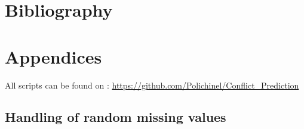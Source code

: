 \documentclass[a4paper]{article}
\begin{document}










\pagebreak

\section{Bibliography}
 


\pagebreak
\section{Appendices}

All scripts can be found on : \hyperlink{https://github.com/Polichinel/Conflict_Prediction}{https://github.com/Polichinel/Conflict\_Prediction}

\subsection{Handling of random missing values}\label{missing}
\end{document}

